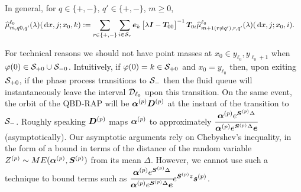 In general, for \(q\in \{+,-\}, \, q'\in\{+,-\}\), \(m\geq 0\),
\begin{align*}
	\widehat \mu_{m,q0,q'}^{\ell_0}(\lambda)(\, \mathrm{d} x,j;x_0,k) \nonumber 
	&:= \sum_{r\in\{+,-\}}\sum_{i\in\mathcal{S}_r}\boldsymbol e_k\begin{bmatrix} \lambda \boldsymbol I - \boldsymbol T_{00} \end{bmatrix}^{-1}\boldsymbol T_{0i}\widehat \mu_{m+1(r\neq q'),r,q'}^{\ell_0}(\lambda)(\, \mathrm{d} x,j;x_0,i).
\end{align*}

\begin{rem}
For technical reasons we should not have point masses at \(x_0\in{y_{\ell_0},y_{\ell_0+1}}\) when \(\varphi(0)\in\mathcal{S}_{+0}\cup\mathcal{S}_{-0}\). Intuitively, if \(\varphi(0)=k\in\mathcal{S}_{+0}\) and \(x_0 = y_{\ell_0}\) then, upon exiting \(\mathcal{S}_{+0}\), if the phase process transitions to \(\mathcal{S}_-\) then the fluid queue will instantaneously leave the interval \(\mathcal{D}_{\ell_0}\) upon this transition. On the same event, the orbit of the QBD-RAP will be \(\boldsymbol \alpha^{(p)} \boldsymbol D^{(p)}\) at the instant of the transition to \(\mathcal{S}_-\). Roughly speaking \(\boldsymbol D^{(p)}\) maps \(\boldsymbol \alpha^{(p)}\) to approximately \(\cfrac{\boldsymbol \alpha^{(p)} e^{\boldsymbol S^{(p)}\Delta}}{\boldsymbol \alpha^{(p)} e^{\boldsymbol S^{(p)}\Delta}\boldsymbol e}\) (asymptotically). Our asymptotic arguments rely on Chebyshev's inequality, in the form of a bound in terms of the distance of the random variable \(Z^{(p)}\sim ME(\boldsymbol\alpha^{(p)},\boldsymbol S^{(p)})\) from its mean \(\Delta\). However, we cannot use such a technique to bound terms such as \(\cfrac{\boldsymbol \alpha^{(p)} e^{\boldsymbol S^{(p)}\Delta}}{\boldsymbol \alpha^{(p)} e^{\boldsymbol S^{(p)}\Delta}\boldsymbol e}e^{\boldsymbol S^{(p)}z}\boldsymbol s^{(p)}\). %


\end{rem}
